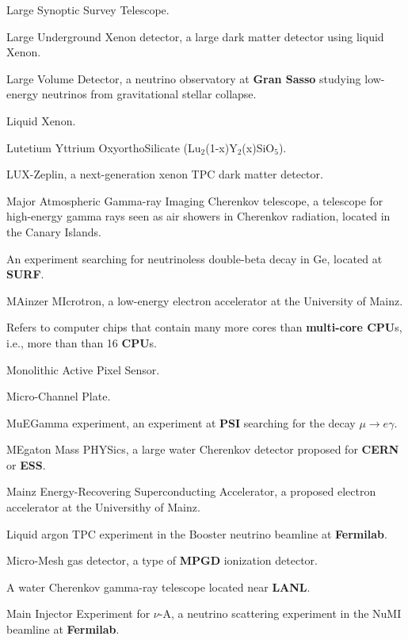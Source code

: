  Large Synoptic Survey Telescope.

 Large Underground Xenon detector, a large dark matter
detector using liquid Xenon.

 Large Volume Detector, a neutrino observatory at {\bf Gran
Sasso} studying low-energy neutrinos from gravitational stellar collapse.

 Liquid Xenon.

 Lutetium Yttrium OxyorthoSilicate (Lu$_2$(1-x)Y$_2$(x)SiO$_5$).

 LUX-Zeplin, a next-generation xenon TPC dark matter detector.

  Major Atmospheric Gamma-ray Imaging Cherenkov
telescope, a telescope for high-energy gamma rays seen as air showers
in Cherenkov radiation, located in the Canary Islands.

 An experiment searching for neutrinoless double-beta decay
in Ge, located at {\bf SURF}. 

  MAinzer MIcrotron, a low-energy electron accelerator
at the University of Mainz.

  Refers to computer chips that contain many more
cores than {\bf multi-core CPU}s, i.e., more than  than 16 {\bf CPU}s.

 Monolithic Active Pixel Sensor.

 Micro-Channel Plate.

   MuEGamma experiment, an experiment at {\bf PSI} 
 searching for the decay $\mu \to e \gamma$.


 MEgaton Mass PHYSics, a large water
Cherenkov detector proposed for {\bf CERN} or {\bf ESS}. 

  Mainz Energy-Recovering Superconducting Accelerator,
a proposed electron accelerator at the Universithy of Mainz.


 Liquid argon TPC experiment in the Booster neutrino
beamline at {\bf Fermilab}.

 Micro-Mesh gas detector, a type of {\bf MPGD}
ionization detector.

  A water Cherenkov gamma-ray telescope located 
  near {\bf LANL}. 



 Main Injector Experiment for $\nu$-A, a
neutrino scattering experiment in the NuMI beamline at {\bf Fermilab}.

